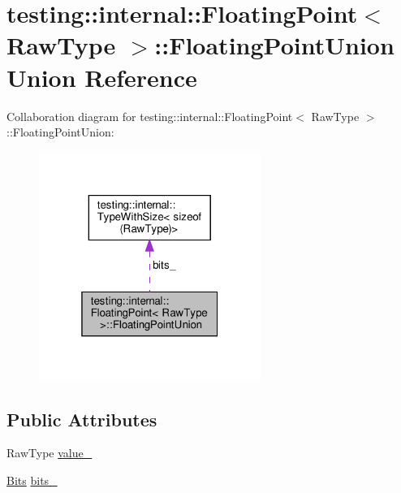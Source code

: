 \hypertarget{uniontesting_1_1internal_1_1FloatingPoint_1_1FloatingPointUnion}{}\section{testing\+:\+:internal\+:\+:Floating\+Point$<$ Raw\+Type $>$\+:\+:Floating\+Point\+Union Union Reference}
\label{uniontesting_1_1internal_1_1FloatingPoint_1_1FloatingPointUnion}


Collaboration diagram for testing\+:\+:internal\+:\+:Floating\+Point$<$ Raw\+Type $>$\+:\+:Floating\+Point\+Union\+:\nopagebreak
\begin{figure}[H]
\begin{center}
\leavevmode
\includegraphics[width=205pt]{uniontesting_1_1internal_1_1FloatingPoint_1_1FloatingPointUnion__coll__graph}
\end{center}
\end{figure}
\subsection*{Public Attributes}
\begin{DoxyCompactItemize}
\item 
Raw\+Type \hyperlink{uniontesting_1_1internal_1_1FloatingPoint_1_1FloatingPointUnion_a4ee324889f70577721393e8e1920e4c6}{value\+\_\+}
\item 
\hyperlink{classtesting_1_1internal_1_1FloatingPoint_abf228bf6cd48f12c8b44c85b4971a731}{Bits} \hyperlink{uniontesting_1_1internal_1_1FloatingPoint_1_1FloatingPointUnion_aedb69e386f5d624a016f7a781302a2bf}{bits\+\_\+}
\end{DoxyCompactItemize}


